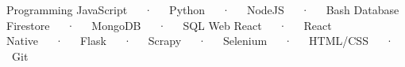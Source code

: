 

\begin{cvtechnicals}
  \cvtechnical %
    {Programming} %
    {JavaScript~~~·~~~Python~~~·~~~NodeJS~~~·~~~Bash} %
    {Database} %
    {Firestore~~~·~~~MongoDB~~~·~~~SQL} %
    {Web} %
    {React~~~·~~~React Native~~~·~~~Flask~~~·~~~Scrapy~~~·~~~Selenium~~~·~~~HTML/CSS~~~·~~~Git} %
\end{cvtechnicals}